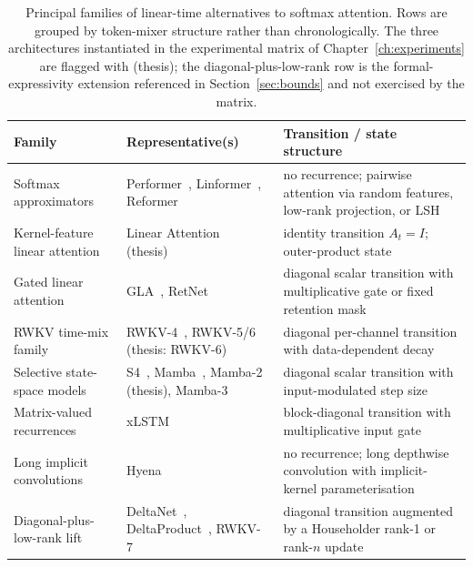 \begin{table}[!htbp]
\centering
\small
\caption[Linear-time alternatives to softmax attention]{Principal
families of linear-time alternatives to softmax attention. Rows
are grouped by token-mixer structure rather than chronologically.
The three architectures instantiated in the experimental matrix of
Chapter~\ref{ch:experiments} are flagged with (thesis); the
diagonal-plus-low-rank row is the formal-expressivity extension
referenced in Section~\ref{sec:bounds} and not exercised by the
matrix.}
\label{tab:related:linear-time}
\setlength{\tabcolsep}{4pt}
\renewcommand{\arraystretch}{1.2}
\begin{tabularx}{\linewidth}{@{}>{\raggedright\arraybackslash}p{3.0cm} >{\raggedright\arraybackslash}p{4.0cm} X@{}}
\toprule
\textbf{Family} & \textbf{Representative(s)} &
\textbf{Transition / state structure} \\
\midrule
Softmax approximators
  & Performer~\cite{choromanski2021performer},
    Linformer~\cite{wang2020linformer},
    Reformer~\cite{kitaev2020reformer}
  & no recurrence; pairwise attention via random features, low-rank projection, or LSH \\
\addlinespace
Kernel-feature linear attention
  & Linear Attention~\cite{katharopoulos2020transformers} (thesis)
  & identity transition $A_{t} = I$; outer-product state \\
\addlinespace
Gated linear attention
  & GLA~\cite{yang2024gla},
    RetNet~\cite{sun2023retnet}
  & diagonal scalar transition with multiplicative gate or fixed retention mask \\
\addlinespace
RWKV time-mix family
  & RWKV-4~\cite{peng2023rwkv},
    RWKV-5/6~\cite{peng2024eaglefinch} (thesis: RWKV-6)
  & diagonal per-channel transition with data-dependent decay \\
\addlinespace
Selective state-space models
  & S4~\cite{gu2022s4},
    Mamba~\cite{gu2023mamba},
    Mamba-2~\cite{dao2024transformers} (thesis),
    Mamba-3~\cite{lahoti2026mamba3}
  & diagonal scalar transition with input-modulated step size \\
\addlinespace
Matrix-valued recurrences
  & xLSTM~\cite{beck2024xlstm}
  & block-diagonal transition with multiplicative input gate \\
\addlinespace
Long implicit convolutions
  & Hyena~\cite{poli2023hyena}
  & no recurrence; long depthwise convolution with implicit-kernel parameterisation \\
\addlinespace
Diagonal-plus-low-rank lift
  & DeltaNet~\cite{schlag2021deltanet, yang2024deltanet},
    DeltaProduct~\cite{siems2025deltaproduct},
    RWKV-7~\cite{peng2025rwkv7}
  & diagonal transition augmented by a Householder rank-1 or rank-$n$ update \\
\bottomrule
\end{tabularx}
\end{table}

